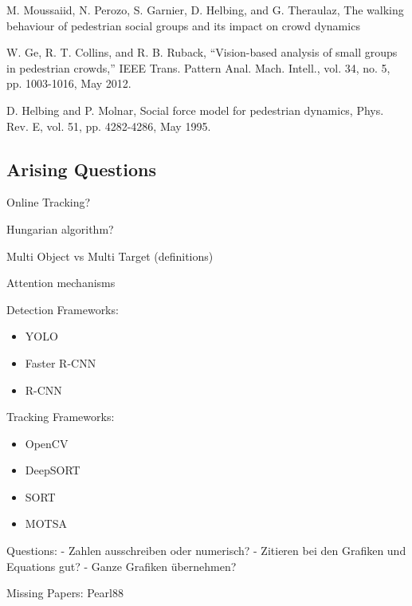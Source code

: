 M. Moussaiid, N. Perozo, S. Garnier, D. Helbing, and G. Theraulaz, The walking behaviour of pedestrian social groups and its impact on crowd dynamics

W. Ge, R. T. Collins, and R. B. Ruback, “Vision-based analysis of small groups in pedestrian crowds,” IEEE Trans. Pattern Anal. Mach. Intell., vol. 34, no. 5, pp. 1003-1016, May 2012.

D. Helbing and P. Molnar, Social force model for pedestrian dynamics, Phys. Rev. E, vol. 51, pp. 4282-4286, May 1995.

\subsection{Arising Questions}

Online Tracking?

Hungarian algorithm?

Multi Object vs Multi Target (definitions)

Attention mechanisms

Detection Frameworks:
\begin{itemize}
    \item YOLO
    \item Faster R-CNN
    \item R-CNN
\end{itemize}

Tracking Frameworks:
\begin{itemize}
    \item OpenCV
    \item DeepSORT
    \item SORT
    \item MOTSA
\end{itemize}

Questions:
- Zahlen ausschreiben oder numerisch?
- Zitieren bei den Grafiken und Equations gut?
- Ganze Grafiken übernehmen?

Missing Papers:
Pearl88